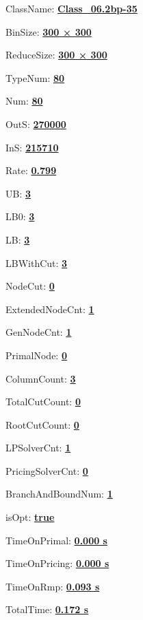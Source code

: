 \documentclass[11pt]{article}
\begin{document}
\pagestyle{empty}


ClassName: \underline{\textbf{Class_06.2bp-35}}
\par
BinSize: \underline{\textbf{300 × 300}}
\par
ReduceSize: \underline{\textbf{300 × 300}}
\par
TypeNum: \underline{\textbf{80}}
\par
Num: \underline{\textbf{80}}
\par
OutS: \underline{\textbf{270000}}
\par
InS: \underline{\textbf{215710}}
\par
Rate: \underline{\textbf{0.799}}
\par
UB: \underline{\textbf{3}}
\par
LB0: \underline{\textbf{3}}
\par
LB: \underline{\textbf{3}}
\par
LBWithCut: \underline{\textbf{3}}
\par
NodeCut: \underline{\textbf{0}}
\par
ExtendedNodeCnt: \underline{\textbf{1}}
\par
GenNodeCnt: \underline{\textbf{1}}
\par
PrimalNode: \underline{\textbf{0}}
\par
ColumnCount: \underline{\textbf{3}}
\par
TotalCutCount: \underline{\textbf{0}}
\par
RootCutCount: \underline{\textbf{0}}
\par
LPSolverCnt: \underline{\textbf{1}}
\par
PricingSolverCnt: \underline{\textbf{0}}
\par
BranchAndBoundNum: \underline{\textbf{1}}
\par
isOpt: \underline{\textbf{true}}
\par
TimeOnPrimal: \underline{\textbf{0.000 s}}
\par
TimeOnPricing: \underline{\textbf{0.000 s}}
\par
TimeOnRmp: \underline{\textbf{0.093 s}}
\par
TotalTime: \underline{\textbf{0.172 s}}
\par
\newpage
\end{document}

